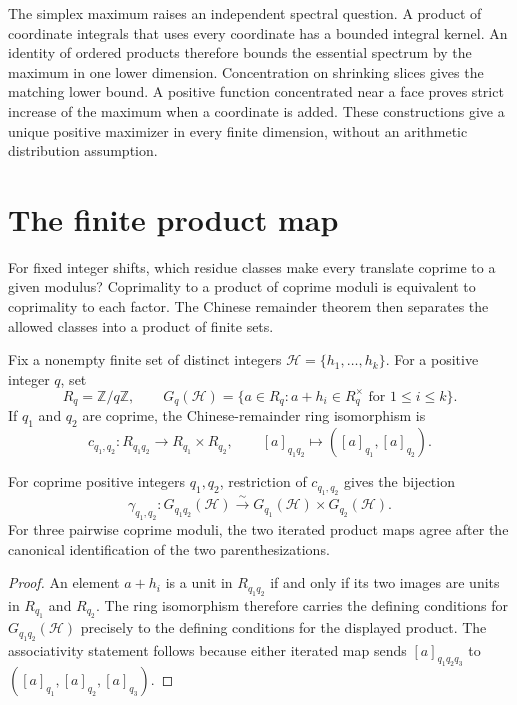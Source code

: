 \documentclass[11pt]{article}
\begin{document}
The simplex maximum raises an independent spectral question.
A product of coordinate integrals that uses every coordinate has a bounded
integral kernel.  An identity of ordered products therefore bounds the
essential spectrum by the maximum in one lower dimension.
Concentration on shrinking slices gives the matching lower bound.
A positive function concentrated near a face proves strict increase of
the maximum when a coordinate is added.  These constructions give a unique
positive maximizer in every finite dimension, without an arithmetic
distribution assumption.

\section{The finite product map}

For fixed integer shifts, which residue classes make every translate coprime
to a given modulus?  Coprimality to a product of coprime moduli is equivalent
to coprimality to each factor.  The Chinese remainder theorem then separates
the allowed classes into a product of finite sets.

Fix a nonempty finite set of distinct integers
$\mathcal H=\{h_1,\ldots,h_k\}$.  For a positive integer $q$, set
\[
 R_q=\mathbb Z/q\mathbb Z,
 \qquad
 G_q(\mathcal H)
 =\bigl\{a\in R_q:a+h_i\in R_q^\times\text{ for }1\leq i\leq k\bigr\}.
\]
If $q_1$ and $q_2$ are coprime, the Chinese-remainder ring isomorphism is
\[
 c_{q_1,q_2}:R_{q_1q_2}\longrightarrow R_{q_1}\times R_{q_2},
 \qquad
 [a]_{q_1q_2}\longmapsto([a]_{q_1},[a]_{q_2}).
\]

\begin{proposition}
For coprime positive integers $q_1,q_2$, restriction of $c_{q_1,q_2}$ gives
the bijection
\[
 \gamma_{q_1,q_2}:G_{q_1q_2}(\mathcal H)
 \xrightarrow{\ \sim\ }
 G_{q_1}(\mathcal H)\times G_{q_2}(\mathcal H).
\]
For three pairwise coprime moduli, the two iterated product maps agree after
the canonical identification of the two parenthesizations.
\end{proposition}

\begin{proof}
An element $a+h_i$ is a unit in $R_{q_1q_2}$ if and only if its two images
are units in $R_{q_1}$ and $R_{q_2}$.  The ring isomorphism therefore carries
the defining conditions for $G_{q_1q_2}(\mathcal H)$ precisely to the defining
conditions for the displayed product.  The associativity statement follows
because either iterated map sends $[a]_{q_1q_2q_3}$ to
$([a]_{q_1},[a]_{q_2},[a]_{q_3})$.
\end{proof}
\end{document}
